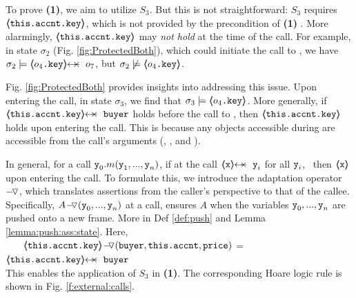  \vspace{.1cm}
 
To prove \textbf{(1)}, we aim to utilize $S_3$. But this is not straightforward: %
 $S_3$  requires 
 {\color{red} {$\inside{\prg{this.\myAccount.key}}$}}, 
 which is not provided by the precondition of \textbf{(1)} .
 More alarmingly,  
$\inside{\prg{this.\myAccount.key}}$ may \emph{not hold} at the time of the call.
%
For example, in state $\sigma_2$ (Fig. \ref{fig:ProtectedBoth}), which could initiate the call to , we have $\sigma_2 \models \protectedFrom{o_4\prg{.key}} {o_7}$, but $\sigma_2 \not\models \inside{o_4\prg{.key}}$.

Fig. \ref{fig:ProtectedBoth} provides insights into addressing this issue. Upon entering the call, in state $\sigma_3$, 
we find that $\sigma_3 \models \inside{o_4\prg{.key}}$. More generally, if $\protectedFrom{\prg{this.\myAccount.key}}{\prg{buyer}}$ holds before the call to , then $\inside{\prg{this.\myAccount.key}}$ holds upon entering the call.
 This is because any objects   accessible during  are accessible from the call's arguments %
 (\ie {}, , and ).

In general, for a call $\prg{y}_0.m(\prg{y}_1, ..., \prg{y}_n)$, if at the call $\protectedFrom{\prg{x}}{\prg{y}_i}$  for all %
 $\prg{y}_i$, \  then $\inside{\prg{x}}$   upon entering the call. 
To formulate this, we introduce the adaptation operator $\pushSymbolInText$, which translates assertions from the caller's perspective to that of the callee. 
Specifically, $\PushASLong  {(\prg{y}_0, ..., \prg{y}_n)}   A$ at a call, ensures   $A$  when the variables  $\prg{y}_0, ..., \prg{y}_n$ are pushed onto a new frame. More in Def   \ref{def:push} and  Lemma \ref{lemma:push:ass:state}. Here, \\
$\strut \ \ \ \ $  \small $\PushASLong {(\prg{buyer},\prg{this.\myAccount},\prg{price})} {\inside{\prg{this.\myAccount.key}}}$
= $\protectedFrom{\prg{this.\myAccount.key}}{\prg{buyer}}$\\
  \normalsize   This enables the application of $S_3$ in \textbf{(1)}. The corresponding Hoare logic rule is shown in Fig. \ref{f:external:calls}.

